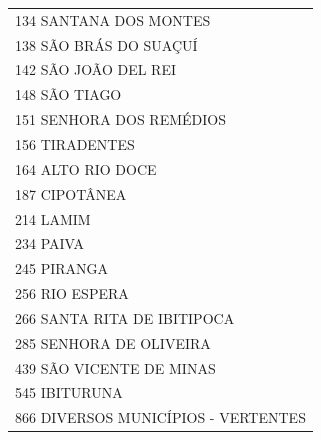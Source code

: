 \documentclass{article}
\begin{document}
\begin{longtable}[c]{m{18cm}}
\multicolumn{1}{l}{ \hspace{2em} 134 SANTANA DOS MONTES } \\
\multicolumn{1}{l}{ \hspace{2em} 138 SÃO BRÁS DO SUAÇUÍ } \\
\multicolumn{1}{l}{ \hspace{2em} 142 SÃO JOÃO DEL REI } \\
\multicolumn{1}{l}{ \hspace{2em} 148 SÃO TIAGO } \\
\multicolumn{1}{l}{ \hspace{2em} 151 SENHORA DOS REMÉDIOS } \\
\multicolumn{1}{l}{ \hspace{2em} 156 TIRADENTES } \\
\multicolumn{1}{l}{ \hspace{2em} 164 ALTO RIO DOCE } \\
\multicolumn{1}{l}{ \hspace{2em} 187 CIPOTÂNEA } \\
\multicolumn{1}{l}{ \hspace{2em} 214 LAMIM } \\
\multicolumn{1}{l}{ \hspace{2em} 234 PAIVA } \\
\multicolumn{1}{l}{ \hspace{2em} 245 PIRANGA } \\
\multicolumn{1}{l}{ \hspace{2em} 256 RIO ESPERA } \\
\multicolumn{1}{l}{ \hspace{2em} 266 SANTA RITA DE IBITIPOCA } \\
\multicolumn{1}{l}{ \hspace{2em} 285 SENHORA DE OLIVEIRA } \\
\multicolumn{1}{l}{ \hspace{2em} 439 SÃO VICENTE DE MINAS } \\
\multicolumn{1}{l}{ \hspace{2em} 545 IBITURUNA } \\
\multicolumn{1}{l}{ \hspace{2em} 866 DIVERSOS MUNICÍPIOS - VERTENTES } \\
\end{longtable}
\newpage
\end{document}

